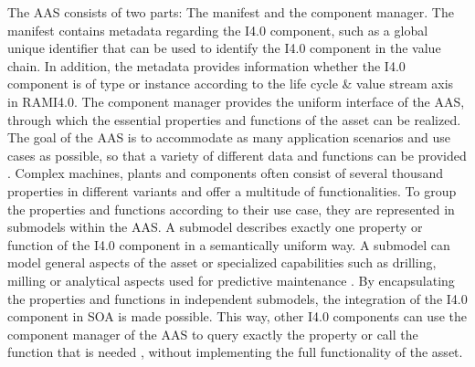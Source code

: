 The \ac{AAS} consists of two parts: The manifest and the component manager. The manifest contains metadata regarding the \ac{I4.0} component, such as a global unique identifier that can be used to identify the \ac{I4.0} component in the value chain. In addition, the metadata provides information whether the \ac{I4.0} component is of type or instance according to the life cycle \& value stream axis in \ac{RAMI4.0}. The component manager provides the uniform interface of the \ac{AAS}, through which the essential properties and functions of the asset can be realized. The goal of the \ac{AAS} is to accommodate as many application scenarios and use cases as possible, so that a variety of different data and functions can be provided \cite[p. 25]{Adolphs2016StructureComponent}. Complex machines, plants and components often consist of several thousand properties in different variants and offer a multitude of functionalities. To group the properties and functions according to their use case, they are represented in submodels within the \ac{AAS}. A submodel describes exactly one property or function of the \ac{I4.0} component in a semantically uniform way. A submodel can model general aspects of the asset or specialized capabilities such as drilling, milling or analytical aspects used for predictive maintenance \cite[p. 23]{Belyaev2021ModellingECLASS}. By encapsulating the properties and functions in independent submodels, the integration of the \ac{I4.0} component in \ac{SOA} is made possible. This way, other \ac{I4.0} components can use the component manager of the \ac{AAS} to query exactly the property or call the function that is needed \cite[p. 6]{Koschnick2016Beispiele4.0-Komponente-Basisteil}, without implementing the full functionality of the asset.

